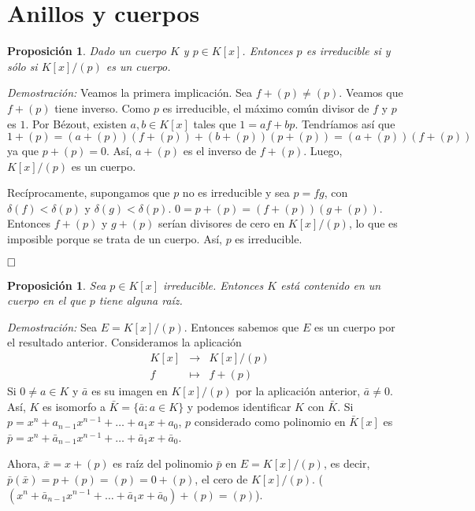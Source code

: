 \documentclass[12pt]{article}
\newtheorem{proposition}[theorem]{Proposición}
\begin{document}
\section{Anillos y cuerpos}

\begin{proposition} Dado un cuerpo $K$ y $p \in K[x]$. Entonces $p$ es irreducible si y sólo si $K[x]/(p)$ es un cuerpo.
\end{proposition}
\emph{Demostración: }Veamos la primera implicación. Sea $f + (p) \neq (p)$. Veamos que $f + (p)$ tiene inverso. Como $p$ es irreducible, el máximo común divisor de $f$ y $p$ es $1$. Por Bézout, existen $a,b \in K[x]$ tales que $1 = af + bp$. Tendríamos así que $$1 + (p) = (a+ (p))(f+(p)) + (b+(p))(p+(p)) = (a+ (p))(f+(p))$$ ya que $p+(p)=0$. Así, $a+(p)$ es el inverso de $f+(p)$. Luego, $K[x]/(p)$ es un cuerpo.

Recíprocamente, supongamos que $p$ no es irreducible y sea $p = fg$, con $\delta(f) < \delta (p)$ y $\delta(g) < \delta (p)$. $0 =p +(p) = (f+(p))(g+(p))$. Entonces $f + (p)$ y $g +(p)$ serían divisores de cero en $K[x]/(p)$, lo que es imposible porque se trata de un cuerpo. Así, $p$ es irreducible.

$\hfill \square$

\begin{proposition}\label{eq:ac1} Sea $p \in K[x]$ irreducible. Entonces $K$ está contenido en un cuerpo en el que $p$ tiene alguna raíz.
\end{proposition}
\emph{Demostración: } Sea $E = K[x]/(p)$. Entonces sabemos que $E$ es un cuerpo por el resultado anterior. Consideramos la aplicación $$\begin{array}{rccl}
&K[x]&\longrightarrow &K[x]/(p) \\
&f& \longmapsto &f+(p)
\end{array}
$$
Si $0 \neq a \in K$ y $\bar{a}$ es su imagen en $K[x]/(p)$ por la aplicación anterior, $\bar{a} \neq 0$. Así, $K$ es isomorfo a $\bar{K} = \lbrace \bar{a}: a \in K \rbrace$ y podemos identificar $K$ con $\bar{K}$. Si $p = x^{n} + a_{n-1}x^{n-1} + \ldots + a_{1}x + a_{0}$, $p$ considerado como polinomio en $\bar{K}[x]$ es $\bar{p} = x^{n}+ \bar{a}_{n-1}x^{n-1}+ \ldots + \bar{a}_{1}x + \bar{a}_{0}$.

Ahora, $\bar{x} = x +(p)$ es raíz del polinomio $\bar{p}$ en $E= K[x]/(p)$, es decir, $\bar{p}(\bar{x}) = p+(p) = (p) = 0 +(p)$, el cero de $K[x]/(p)$. ($(x^{n}+ \bar{a}_{n-1}x^{n-1}+ \ldots + \bar{a}_{1}x + \bar{a}_{0}) + (p) = (p)$).
\end{document}
